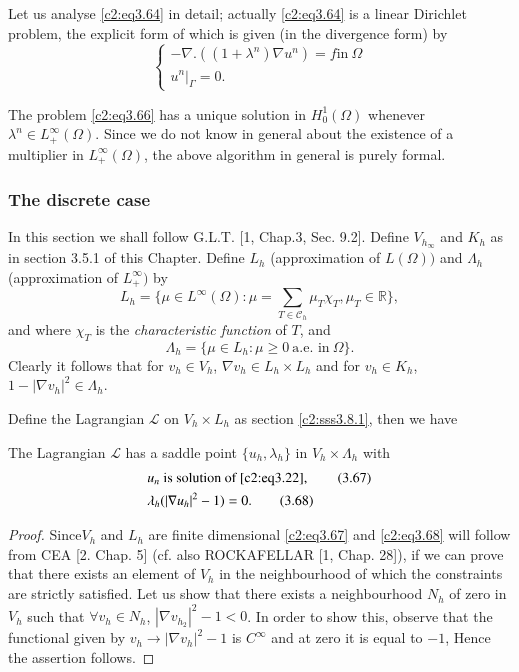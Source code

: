 Let us analyse \eqref{c2:eq3.64} in detail; actually \eqref{c2:eq3.64}
is a linear Dirichlet problem, the explicit form of which is given (in
the divergence form) by  
\begin{equation}
\begin{cases}
-\nabla .((1+\lambda^n) \nabla u^n) = f \text{in}~ \Omega\\
u^n |_\Gamma =0. \tag{3.66}\label{c2:eq3.66}
\end{cases}
\end{equation}

The problem \eqref{c2:eq3.66} has a unique solution in $H^1_0(\Omega)$
whenever $\lambda^n \in L^\infty_+ (\Omega)$. Since we do not know in
general  about the existence of a multiplier in $L^\infty_+ (\Omega)$,
the above algorithm in general is purely formal. 

\subsubsection{The discrete case}\label{c2:sss3.8.2}%

In this section we shall follow G.L.T. [1, Chap.3, Sec. 9.2]. Define
$V_{h_\infty}$ and $K_h$ as in  section 3.5.1 of this Chapter. Define
$L_h$ (approximation of $L(\Omega))$ and $\Lambda_h$ (approximation of
$L^\infty_+)$ by 
$$
L_h = \{\mu \in L^\infty (\Omega) : \mu = \sum_{T \in
  \mathscr{C}_h} \mu_T \chi_T, \mu_T  \in \mathbb{R} \}, 
$$
and where $\chi_T$ is the \textit{characteristic function } of $T$, and 
$$
\Lambda_h = \{\mu \in L_h : \mu \geq 0 ~\text{a.e. in}~ \Omega \} .
$$
Clearly it follows that for $v_h \in V_h$, $\nabla v_h
\in L_h \times L_h$ and for $v_h \in K_h$, $1-|
\nabla v_h |^2 \in \Lambda_h$. 

Define the Lagrangian $\mathscr{L}$ on $V_h \times L_h$ as section
\ref{c2:sss3.8.1}, then we have  

\begin{proposition}\label{c2:prop3.5}%
The Lagrangian $\mathscr{L}$ has a saddle point $\{u_h, \lambda_h\}$
in $V_h \times \Lambda_h$ with  
\begin{align*}
  & u_n \text{ is solution of  \eqref{c2:eq3.22}},
  \tag{3.67}\label{c2:eq3.67}\\ 
  & \lambda_h (|\nabla u_h |^2 -1) =
  0. \tag{3.68}\label{c2:eq3.68} 
\end{align*}
\end{proposition}

\begin{proof}
Since\pageoriginale  $V_h$ and $L_h$ are finite dimensional
\eqref{c2:eq3.67} and \eqref{c2:eq3.68} will 
follow from CEA [2. Chap. 5] (cf. also ROCKAFELLAR [1, Chap. 28]), if
we can prove that there exists an element of $V_h$ in the
neighbourhood of which the constraints are strictly satisfied. Let us
show that there exists a neighbourhood  $N_h$ of zero in $V_h$ such
that $\forall v_h \in N_h$, $|\nabla v_{h_2}|^2 -1 <
0$. In order to show this, observe that the functional given by $v_h
\to | \nabla v_h |^2 -1 $ is $C^\infty$ and at zero it is equal
to $-1$, Hence  the assertion follows. 
\end{proof}


